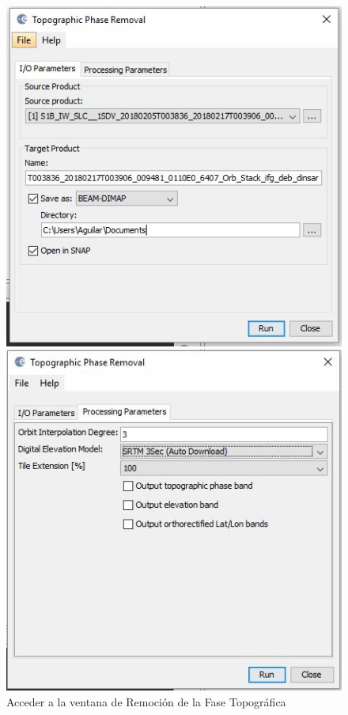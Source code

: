 \documentclass{article}
\begin{document}
\begin{figure}[htbp]
\begin{minipage}[b]{0.5\linewidth}
\centering
\includegraphics[width=\linewidth]{Imagen/10.JPG}
\caption{Acceder a la ventana de Remoción de la Fase Topográfica }
\label{fig:figura10}
\end{minipage}
\hspace{0.2cm}
\begin{minipage}[b]{0.5\linewidth}
\centering
\includegraphics[width=\linewidth]{Imagen/11.JPG}

\end{minipage}
\end{figure}
\end{document}
